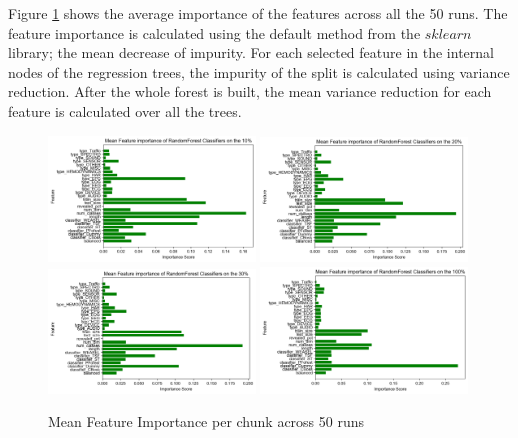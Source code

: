 Figure \ref{Img:MeanFeatureImportance} shows the average importance of the features across all the 50 runs.
The feature importance is calculated using the default method from the $sklearn$ library; the mean decrease of impurity.
For each selected feature in the internal nodes of the regression trees, the impurity of the split is calculated using variance reduction.
After the whole forest is built, the mean variance reduction for each feature is calculated over all the trees.

\begin{figure}[hp!]
    \captionsetup{justification=raggedright}
    \includegraphics[width=0.49\textwidth,keepaspectratio]{mean_feature_imp_10pct.png}
    \includegraphics[width=0.49\textwidth,keepaspectratio]{mean_feature_imp_20pct.png}
    \\[\smallskipamount]
    \includegraphics[width=0.49\textwidth,keepaspectratio]{mean_feature_imp_30pct.png}
    \includegraphics[width=0.49\textwidth,keepaspectratio]{mean_feature_imp_100pct.png}
    \caption{Mean Feature Importance per chunk across 50 runs}
    \label{Img:MeanFeatureImportance}
\end{figure}

